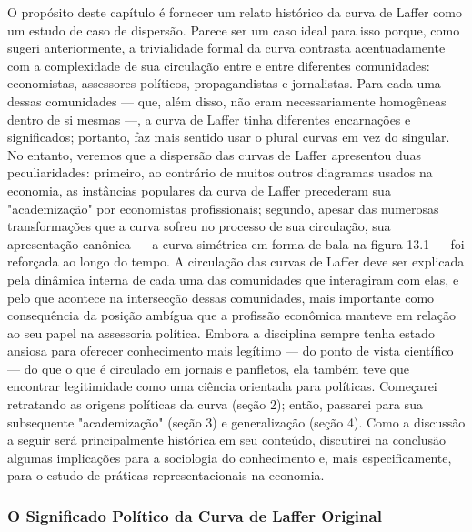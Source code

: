 \documentclass[12pt]{article}
\begin{document}
O propósito deste capítulo é fornecer um relato histórico da curva de Laffer como um estudo de caso de dispersão. Parece ser um caso ideal para isso porque, como sugeri anteriormente, a trivialidade formal da curva contrasta acentuadamente com a complexidade de sua circulação entre e entre diferentes comunidades: economistas, assessores políticos, propagandistas e jornalistas. Para cada uma dessas comunidades — que, além disso, não eram necessariamente homogêneas dentro de si mesmas —, a curva de Laffer tinha diferentes encarnações e significados; portanto, faz mais sentido usar o plural curvas em vez do singular. No entanto, veremos que a dispersão das curvas de Laffer apresentou duas peculiaridades: primeiro, ao contrário de muitos outros diagramas usados na economia, as instâncias populares da curva de Laffer precederam sua "academização" por economistas profissionais; segundo, apesar das numerosas transformações que a curva sofreu no processo de sua circulação, sua apresentação canônica — a curva simétrica em forma de bala na figura 13.1 — foi reforçada ao longo do tempo. A circulação das curvas de Laffer deve ser explicada pela dinâmica interna de cada uma das comunidades que interagiram com elas, e pelo que acontece na intersecção dessas comunidades, mais importante como consequência da posição ambígua que a profissão econômica manteve em relação ao seu papel na assessoria política. Embora a disciplina sempre tenha estado ansiosa para oferecer conhecimento mais legítimo — do ponto de vista científico — do que o que é circulado em jornais e panfletos, ela também teve que encontrar legitimidade como uma ciência orientada para políticas. Começarei retratando as origens políticas da curva (seção 2); então, passarei para sua subsequente "academização" (seção 3) e generalização (seção 4). Como a discussão a seguir será principalmente histórica em seu conteúdo, discutirei na conclusão algumas implicações para a sociologia do conhecimento e, mais especificamente, para o estudo de práticas representacionais na economia.

\subsubsection{\textbf{O Significado Político da Curva de Laffer Original}}
\end{document}
